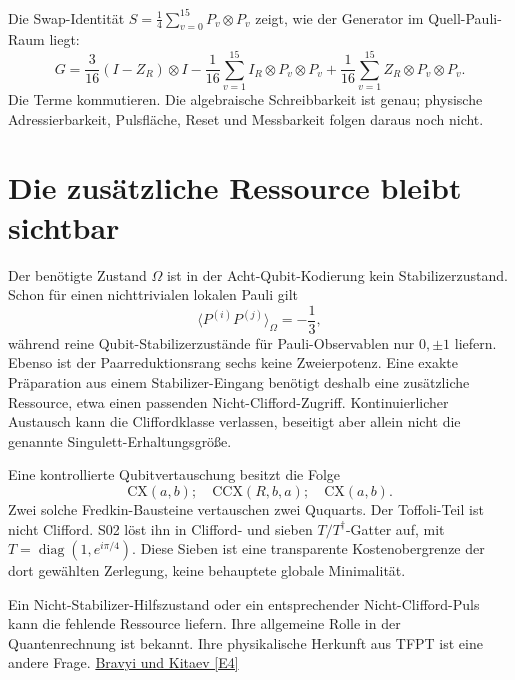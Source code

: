 Die Swap-Identität $S=\frac14\sum_{v=0}^{15}P_v\otimes P_v$ zeigt, wie der Generator im Quell-Pauli-Raum liegt:
\begin{equation}
G=\frac3{16}(I-Z_R)\otimes I
-\frac1{16}\sum_{v=1}^{15}I_R\otimes P_v\otimes P_v
+\frac1{16}\sum_{v=1}^{15}Z_R\otimes P_v\otimes P_v.
\end{equation}
Die Terme kommutieren. Die algebraische Schreibbarkeit ist genau; physische Adressierbarkeit, Pulsfläche, Reset und Messbarkeit folgen daraus noch nicht.

\section{Die zusätzliche Ressource bleibt sichtbar}
Der benötigte Zustand $\Omega$ ist in der Acht-Qubit-Kodierung kein Stabilizerzustand. Schon für einen nichttrivialen lokalen Pauli gilt
\begin{equation}
\langle P^{(i)}P^{(j)}\rangle_\Omega=-\frac13,
\end{equation}
während reine Qubit-Stabilizerzustände für Pauli-Observablen nur $0,\pm1$ liefern. Ebenso ist der Paarreduktionsrang sechs keine Zweierpotenz. Eine exakte Präparation aus einem Stabilizer-Eingang benötigt deshalb eine zusätzliche Ressource, etwa einen passenden Nicht-Clifford-Zugriff. Kontinuierlicher Austausch kann die Cliffordklasse verlassen, beseitigt aber allein nicht die genannte Singulett-Erhaltungsgröße.

Eine kontrollierte Qubitvertauschung besitzt die Folge
\begin{equation}
\mathrm{CX}(a,b);\quad \mathrm{CCX}(R,b,a);\quad\mathrm{CX}(a,b).
\end{equation}
Zwei solche Fredkin-Bausteine vertauschen zwei Ququarts. Der Toffoli-Teil ist nicht Clifford. S02 löst ihn in Clifford- und sieben $T/T^\dagger$-Gatter auf, mit $T=\operatorname{diag}(1,e^{i\pi/4})$. Diese Sieben ist eine transparente Kostenobergrenze der dort gewählten Zerlegung, keine behauptete globale Minimalität.

Ein Nicht-Stabilizer-Hilfszustand oder ein entsprechender Nicht-Clifford-Puls kann die fehlende Ressource liefern. Ihre allgemeine Rolle in der Quantenrechnung ist bekannt. Ihre physikalische Herkunft aus TFPT ist eine andere Frage. \href{https://arxiv.org/abs/quant-ph/0403025}{Bravyi und Kitaev [E4]}

